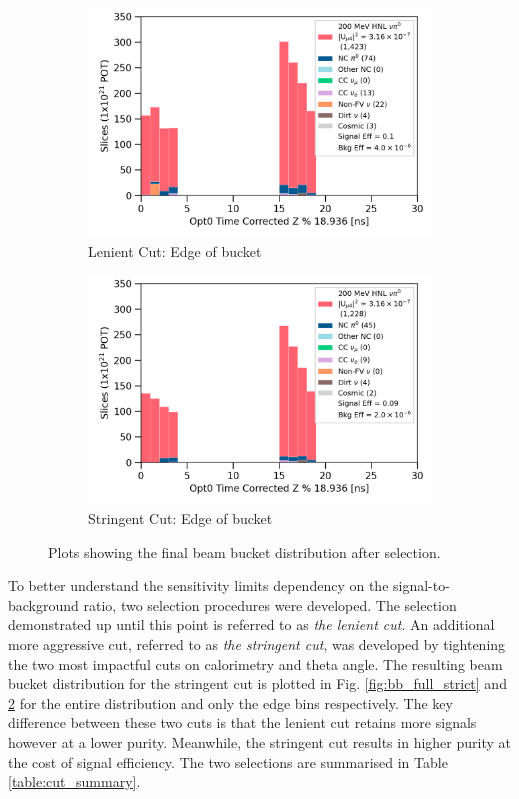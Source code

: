 \begin{figure}[b!]
\begin{subfigure}[b]{0.495\textwidth}
	    \includegraphics[width=\textwidth]{bb_lenient_edge}
            \caption{Lenient Cut: Edge of bucket}%
	    \label{fig:bb_edge_loose}
        \end{subfigure}
        \hfill
        \begin{subfigure}[b]{0.495\textwidth}   
            \centering 
	    \includegraphics[width=\textwidth]{bb_stringent_edge}
            \caption{Stringent Cut: Edge of bucket}%
	    \label{fig:bb_edge_strict}
        \end{subfigure}
        \caption{
		Plots showing the final beam bucket distribution after selection.
	}
        \label{fig:timing_cut}
\end{figure}
To better understand the sensitivity limits dependency on the signal-to-background ratio, two selection procedures were developed.
The selection demonstrated up until this point is referred to as \textit{the lenient cut}.
An additional more aggressive cut, referred to as \textit{the stringent cut}, was developed by tightening the two most impactful cuts on calorimetry and theta angle. 
The resulting beam bucket distribution for the stringent cut is plotted in Fig. \ref{fig:bb_full_strict} 
and \ref{fig:bb_edge_strict} for the entire distribution and only the edge bins respectively. 
The key difference between these two cuts is that the lenient cut retains more signals however at a lower purity.
Meanwhile, the stringent cut results in higher purity at the cost of signal efficiency.
The two selections are summarised in Table \ref{table:cut_summary}.

